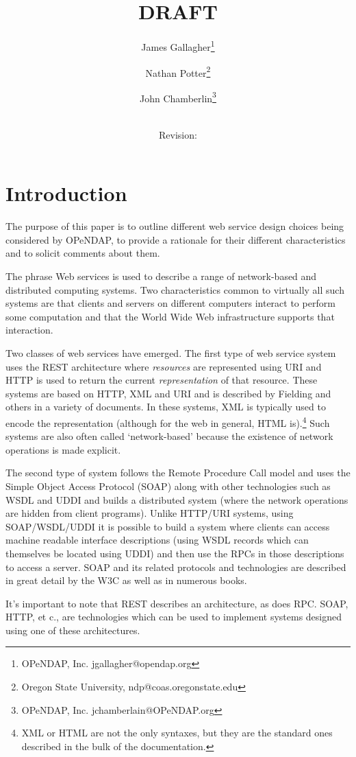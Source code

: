 \documentclass[justify]{dods-paper}
\title{\DAPWebTitle\\ DRAFT}
\author{James Gallagher\thanks{OPeNDAP, Inc. jgallagher@opendap.org}
\and Nathan Potter\thanks{Oregon State University,
  ndp@coas.oregonstate.edu}
\and  John Chamberlin\thanks{OPeNDAP, Inc. jchamberlain@OPeNDAP.org}}
\date{\rcsInfoDate \\ Revision: \rcsInfoRevision}
\begin{document}
\maketitle



\section{Introduction}
The purpose of this paper is to outline different web service design
choices being considered by OPeNDAP, to provide a rationale for
their different characteristics and to solicit comments about them.

The phrase Web services is used to describe a range of network-based
and distributed computing systems. Two characteristics common to
virtually all such systems are that clients and servers on different
computers interact to perform some computation and that the World Wide
Web infrastructure supports that interaction.

Two classes of web services have emerged. The first type of web
service system uses the REST architecture where \emph{resources} are
represented using URI and HTTP is used to return the current
\emph{representation} of that resource. These systems are based on
HTTP, XML and URI and is described by Fielding and others in a variety
of documents.\cite{rfc2616}\cite{Fielding:diss} In these systems, XML
is typically used to encode the representation (although for the web
in general, HTML is).\footnote{XML or HTML are not the only syntaxes,
  but they are the standard ones described in the bulk of the
  documentation.} Such systems are also often called `network-based'
because the existence of network operations is made explicit.

The second type of system follows the Remote Procedure Call model and
uses the Simple Object Access Protocol (SOAP) along with other
technologies such as WSDL and UDDI and builds a distributed system
(where the network operations are hidden from client programs). Unlike
HTTP/URI systems, using SOAP/WSDL/UDDI it is possible to build a
system where clients can access machine readable interface
descriptions (using WSDL records which can themselves be located using
UDDI) and then use the RPCs in those descriptions to access a server.
SOAP and its related protocols and technologies are described in great
detail by the W3C as well as in numerous books.

It's important to note that REST describes an architecture, as does
RPC. SOAP, HTTP, et c., are technologies which can be used to
implement systems designed using one of these architectures.
\end{document}
